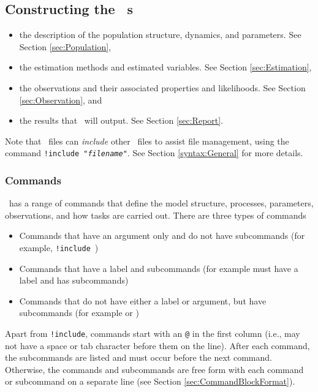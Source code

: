 \subsection{Constructing the \CNAME\ \config s \label{ConstructingConfig}}

\begin{itemize}
	\item the description of the population structure, dynamics, and parameters. See Section \ref{sec:Population},
	\item the estimation methods and estimated variables. See Section \ref{sec:Estimation},
	\item the observations and their associated properties and likelihoods. See Section \ref{sec:Observation}, and
	\item the results that \CNAME\ will output. See Section \ref{sec:Report}.
\end{itemize}

Note that \config\ files can \emph{include} other \config\ files to assist file management, using the command \texttt{!include "\emph{filename}"}. See Section \ref{syntax:General} for more details.

\subsubsection{Commands}

\CNAME\ has a range of commands that define the model structure, processes, parameters, observations, and how tasks are carried out. There are three types of commands

\begin{itemize}
\item Commands that have an argument only and do not have subcommands (for example, \texttt{!include}\ )
\item Commands that have a label and subcommands (for example  must have a label and has subcommands)
\item Commands that do not have either a label or argument, but have subcommands (for example  or )
\end{itemize}

Apart from \texttt{!include}, commands start with an \texttt{@} in the first column (i.e., may not have a space or tab character before them on the line). After each command, the subcommands are listed and must occur before the next command. Otherwise, the commands and subcommands are free form with each command or subcommand on a separate line (see Section \ref{sec:CommandBlockFormat}).

